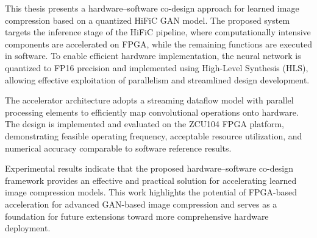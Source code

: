 This thesis presents a hardware--software co-design approach for learned image compression based on a quantized HiFiC GAN model. The proposed system targets the inference stage of the HiFiC pipeline, where computationally intensive components are accelerated on FPGA, while the remaining functions are executed in software. To enable efficient hardware implementation, the neural network is quantized to FP16 precision and implemented using High-Level Synthesis (HLS), allowing effective exploitation of parallelism and streamlined design development.

The accelerator architecture adopts a streaming dataflow model with parallel processing elements to efficiently map convolutional operations onto hardware. The design is implemented and evaluated on the ZCU104 FPGA platform, demonstrating feasible operating frequency, acceptable resource utilization, and numerical accuracy comparable to software reference results.

Experimental results indicate that the proposed hardware--software co-design framework provides an effective and practical solution for accelerating learned image compression models. This work highlights the potential of FPGA-based acceleration for advanced GAN-based image compression and serves as a foundation for future extensions toward more comprehensive hardware deployment.
\cleardoublepage